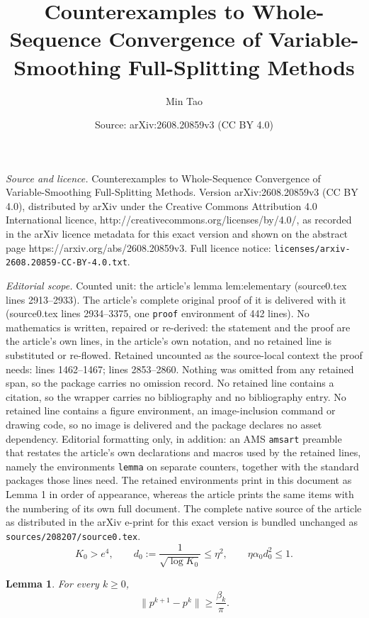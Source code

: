 \documentclass[10pt,a4paper]{amsart}
\title{Counterexamples to Whole-Sequence Convergence of Variable-Smoothing Full-Splitting Methods}
\author{Min Tao}
\date{Source: arXiv:2608.20859v3 (CC BY 4.0)}
\newtheorem{lemma}{Lemma}
\begin{document}
\maketitle

\noindent\emph{Source and licence.} Counterexamples to Whole-Sequence Convergence of Variable-Smoothing Full-Splitting Methods. Version arXiv:2608.20859v3 (CC BY 4.0), distributed by arXiv under the Creative Commons Attribution 4.0 International licence, http://creativecommons.org/licenses/by/4.0/, as recorded in the arXiv licence metadata for this exact version and shown on the abstract page https://arxiv.org/abs/2608.20859v3. Full licence notice: \texttt{licenses/arxiv-2608.20859-CC-BY-4.0.txt}.\par\smallskip

\noindent\textit{Editorial scope.} Counted unit: the article's lemma lem:elementary (source0.tex lines 2913--2933). The article's complete original proof of it is delivered with it (source0.tex lines 2934--3375, one \texttt{proof} environment of 442 lines). No mathematics is written, repaired or re-derived: the statement and the proof are the article's own lines, in the article's own notation, and no retained line is substituted or re-flowed.  Retained uncounted as the source-local context the proof needs: lines 1462--1467; lines 2853--2860.  Nothing was omitted from any retained span, so the package carries no omission record.  No retained line contains a citation, so the wrapper carries no bibliography and no bibliography entry.  No retained line contains a figure environment, an image-inclusion command or drawing code, so no image is delivered and the package declares no asset dependency.  Editorial formatting only, in addition: an AMS \texttt{amsart} preamble that restates the article's own declarations and macros used by the retained lines, namely the environments \texttt{lemma} on separate counters, together with the standard packages those lines need.  The retained environments print in this document as Lemma 1 in order of appearance, whereas the article prints the same items with the numbering of its own full document.  The complete native source of the article as distributed in the arXiv e-print for this exact version is bundled unchanged as \texttt{sources/208207/source0.tex}.
\begin{equation}\label{eq:K0-conditions}
K_0>e^4,\qquad
d_0:=\frac{1}{\sqrt{\log K_0}}\leq\eta^2,
\qquad
\eta\alpha_0d_0^2\leq1.
\end{equation}

\begin{lemma}
\label{lem:chord-lower-bound}
For every \(k\ge 0\),
\[
\|p^{k+1}-p^k\|
\ge \frac{\beta_k}{\pi}.
\]
\end{lemma}
\end{document}
